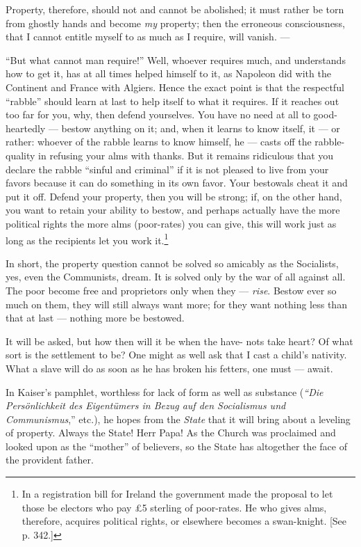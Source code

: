 Property, therefore, should not and cannot be abolished; it must rather be 
torn from ghostly hands and become \textit{my} property; then the erroneous 
consciousness, that I cannot entitle myself to as much as I require, will 
vanish. ---

``But what cannot man require!'' Well, whoever requires much, and 
understands how to get it, has at all times helped himself to it, as Napoleon 
did with the Continent and France with Algiers. Hence the exact point is that 
the respectful ``rabble'' should learn at last to help itself to what it 
requires. If it reaches out too far for you, why, then defend yourselves. You 
have no need at all to good-heartedly --- bestow anything on it; and, when it 
learns to know itself, it --- or rather: whoever of the rabble learns to know 
himself, he --- casts off the rabble-quality in refusing your alms with thanks. 
But it remains ridiculous that you declare the rabble ``sinful and 
criminal'' if it is not pleased to live from your favors because it can do 
something in its own favor. Your bestowals cheat it and put it off. Defend 
your property, then you will be strong; if, on the other hand, you want to 
retain your ability to bestow, and perhaps actually have the more political 
rights the more alms (poor-rates) you can give, this will work just as long as 
the recipients let you work it.\footnote{In a registration bill for Ireland 
the government made the proposal to let those be electors who pay \pounds{}5 
sterling of poor-rates. He who gives alms, therefore, acquires political 
rights, or elsewhere becomes a swan-knight. [See p. 342.]}

In short, the property question cannot be solved so amicably as the 
Socialists, yes, even the Communists, dream. It is solved only by the war of 
all against all. The poor become free and proprietors only when they --- \textit{rise}. Bestow ever so much on them, they will still always want more; 
for they want nothing less than that at last --- nothing more be bestowed.

It will be asked, but how then will it be when the have- nots take heart? Of 
what sort is the settlement to be? One might as well ask that I cast a child's 
nativity. What a slave will do as soon as he has broken his fetters, one must --- await.

In Kaiser's pamphlet, worthless for lack of form as well as substance 
(\textit{``Die Pers\"onlichkeit des Eigent\"umers in Bezug auf den 
Socialismus und Communismus},'' etc.), he hopes from the \textit{State} that 
it will bring about a leveling of property. Always the State! Herr Papa! As 
the Church was proclaimed and looked upon as the ``mother'' of believers, so 
the State has altogether the face of the provident father.

